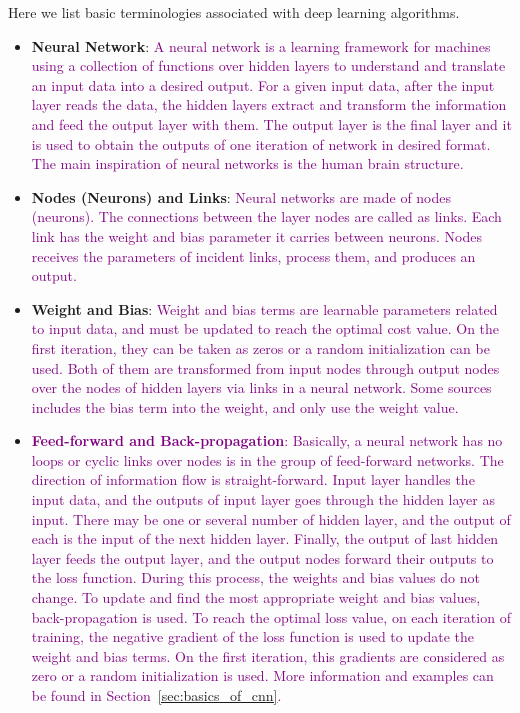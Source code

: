 Here we list basic terminologies associated with deep learning algorithms.

\begin{itemize}
  
\item \textbf{Neural Network}: \textcolor{purple}{A neural network is a learning framework for machines using a collection of functions over hidden layers to understand and translate an input data into a desired output. For a given input data, after the input layer reads the data, the hidden layers extract and transform the information and feed the output layer with them. The output layer is the final layer and it is used to obtain the outputs of one iteration of network in desired format. The main inspiration of neural networks is the human brain structure.}
  
\item \textbf{Nodes (Neurons) and Links}:  \textcolor{purple}{Neural networks are made of nodes (neurons). The connections between the layer nodes are called as links. Each link has the weight and bias parameter it carries between neurons. Nodes receives the parameters of incident links, process them, and produces an output.}
  
\item \textbf{Weight and Bias}: \textcolor{purple}{Weight and bias terms are learnable parameters related to input data, and must be updated to reach the optimal cost value. On the first iteration, they can be taken as zeros or a random initialization can be used. Both of them are transformed from input nodes through output nodes over the nodes of hidden layers via links in a neural network. Some sources includes the bias term into the weight, and only use the weight value.}

\item \textcolor{purple}{\textbf{Feed-forward and Back-propagation}: Basically, a neural network has no loops or cyclic links over nodes is in the group of feed-forward networks. The direction of information flow is straight-forward. Input layer handles the input data, and the outputs of input layer goes through the hidden layer as input. There may be one or several number of hidden layer, and the output of each is the input of the next hidden layer. Finally, the output of last hidden layer feeds the output layer, and the output nodes forward their outputs to the loss function. During this process, the weights and bias values do not change. To update and find the most appropriate weight and bias values, back-propagation is used. To reach the optimal loss value, on each iteration of training, the negative gradient of the loss function is used to update the weight and bias terms. On the first iteration, this gradients are considered as zero or a random initialization is used. More information and examples can be found in Section~\ref{sec:basics_of_cnn}.}


\end{itemize}
